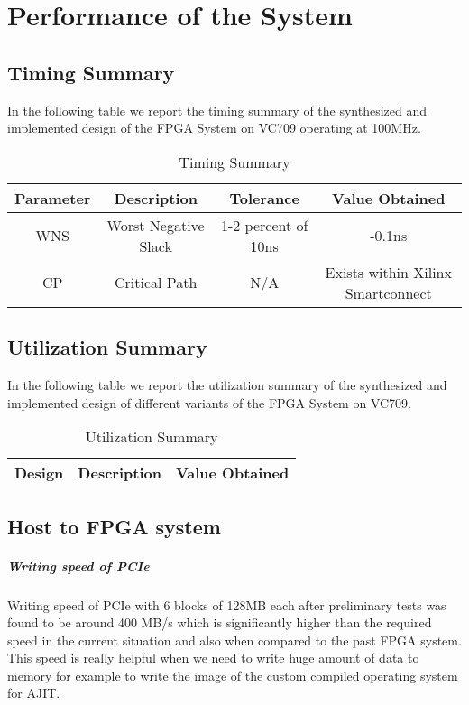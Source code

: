 \chapter{Performance of the System}


\section*{Timing Summary}

In the following table we report the timing summary of the synthesized and implemented design of the FPGA System on VC709 operating at
100MHz.

\begin{table}[H]
\centering
\begin{tabular}{c | c | c | c}
\hline
Parameter & Description & Tolerance & Value Obtained \\
\hline
WNS & Worst Negative Slack & 1-2 percent of 10ns & -0.1ns\\
CP & Critical Path & N/A & Exists within Xilinx Smartconnect  
\end{tabular}
\caption{Timing Summary}
\end{table}

\section*{Utilization Summary}
In the following table we report the utilization summary of the synthesized and implemented design of different variants of the FPGA System
on VC709.

\begin{table}[H]
\centering
\begin{tabular}{c | c | c}
\hline
Design & Description & Value Obtained \\
\hline
\end{tabular}
\caption{Utilization Summary}
\end{table}

\section*{Host to FPGA system}

\paragraph{Writing speed of PCIe\\}
\setlength{\parindent}{0em}
Writing speed of PCIe with 6 blocks of 128MB each after preliminary tests was found to be around 400 MB/s which is significantly higher than
the required speed in the current situation and also when compared to the past FPGA system. This speed is really helpful when we need to
write huge amount of data to memory for example to write the image of the custom compiled operating system for AJIT.

